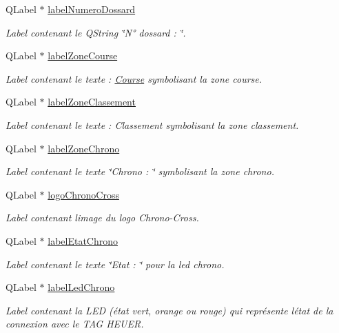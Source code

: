 \begin{DoxyCompactItemize}
Q\+Label $\ast$ \hyperlink{class_i_h_m_chrono_cross_a73afea901ae4b6eb4c0d136818ed1fa6}{label\+Numero\+Dossard}
\begin{DoxyCompactList}\small\item\em Label contenant le Q\+String \char`\"{}\+N° dossard \+: \char`\"{}. \end{DoxyCompactList}\item 
Q\+Label $\ast$ \hyperlink{class_i_h_m_chrono_cross_a7684bc78d49abe63f021ee623bea575e}{label\+Zone\+Course}
\begin{DoxyCompactList}\small\item\em Label contenant le texte \+: \hyperlink{class_course}{Course} symbolisant la zone course. \end{DoxyCompactList}\item 
Q\+Label $\ast$ \hyperlink{class_i_h_m_chrono_cross_ac07ff8651a5a929f8847fa85eef9fe89}{label\+Zone\+Classement}
\begin{DoxyCompactList}\small\item\em Label contenant le texte \+: Classement symbolisant la zone classement. \end{DoxyCompactList}\item 
Q\+Label $\ast$ \hyperlink{class_i_h_m_chrono_cross_ad28922f5316673a1e181747879ef6855}{label\+Zone\+Chrono}
\begin{DoxyCompactList}\small\item\em Label contenant le texte \char`\"{}\+Chrono \+: \char`\"{} symbolisant la zone chrono. \end{DoxyCompactList}\item 
Q\+Label $\ast$ \hyperlink{class_i_h_m_chrono_cross_a76f2f83c624da73e3d3de6a8b4ff43a1}{logo\+Chrono\+Cross}
\begin{DoxyCompactList}\small\item\em Label contenant l\textquotesingle{}image du logo Chrono-\/\+Cross. \end{DoxyCompactList}\item 
Q\+Label $\ast$ \hyperlink{class_i_h_m_chrono_cross_ad247dfd005cb835c90aca67b1384578b}{label\+Etat\+Chrono}
\begin{DoxyCompactList}\small\item\em Label contenant le texte \char`\"{}\+Etat \+: \char`\"{} pour la led chrono. \end{DoxyCompactList}\item 
Q\+Label $\ast$ \hyperlink{class_i_h_m_chrono_cross_ad43bab2d9a06fe2fb198c56d8b9faab2}{label\+Led\+Chrono}
\begin{DoxyCompactList}\small\item\em Label contenant la L\+ED (état vert, orange ou rouge) qui représente l\textquotesingle{}état de la connexion avec le T\+AG H\+E\+U\+ER. \end{DoxyCompactList}\item 

\end{DoxyCompactItemize}
